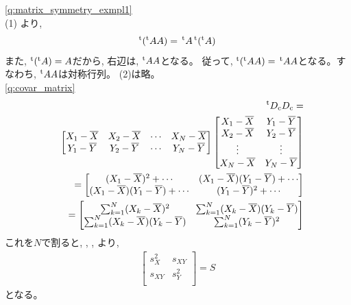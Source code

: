 \ref{q:matrix_symmetry_exmpl1}　\\
(1) より, 
\begin{eqnarray}
^{\text t}(^{\text t}AA)=\,^{\text t}A\,^{\text t}(^{\text t}A)\label{eq:matrix_symmetry_exmpl1}
\end{eqnarray}
また, $^{\text t}(^{\text t}A)=A$だから, 右辺は, $^{\text t}AA$となる。
従って, $^{\text t}(^{\text t}AA)=\,^{\text t}AA$となる。すなわち, $^{\text t}AA$は対称行列。
(2)は略。\\


\ref{q:covar_matrix} 
{\small
\begin{eqnarray}
&&\,^{\text t}D_{\text{c}}D_{\text{c}}=\nonumber\\
&&\begin{bmatrix}
X_1 - \overline{X} & X_2 - \overline{X} & \cdots & X_N - \overline{X}\\
Y_1 - \overline{Y} & Y_2 - \overline{Y} & \cdots & Y_N - \overline{Y}\\
\end{bmatrix}
\begin{bmatrix}
X_1 - \overline{X} & Y_1 - \overline{Y}\\
X_2 - \overline{X} & Y_2 - \overline{Y}\\
\vdots             & \vdots\\
X_N - \overline{X} & Y_N - \overline{Y}\\
\end{bmatrix}\nonumber\\
&&=
\begin{bmatrix}
(X_1 - \overline{X})^2+\cdots & (X_1 - \overline{X})(Y_1-\overline{Y})+\cdots\\
(X_1 - \overline{X})(Y_1-\overline{Y})+\cdots & (Y_1 - \overline{Y})^2+\cdots\\
\end{bmatrix}\nonumber\\
&&=
\begin{bmatrix}
\sum_{k=1}^N (X_k-\overline{X})^2 & \sum_{k=1}^N (X_k-\overline{X})(Y_k-\overline{Y})\\
\sum_{k=1}^N (X_k-\overline{X})(Y_k-\overline{Y}) & \sum_{k=1}^N (Y_k-\overline{Y})^2\\
\end{bmatrix}\nonumber\\
\end{eqnarray}}
これを$N$で割ると, , , より, 
\begin{eqnarray}
\left[\begin{array}{ccc}
s_{X}^2 & s_{XY}\\
s_{XY}  & s_{Y}^2\\
\end{array}\right]=S
\end{eqnarray}
となる。\\

